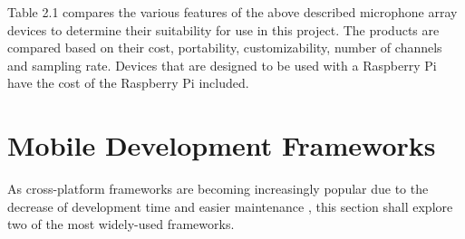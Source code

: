 \documentclass[hidelinks,12pt]{report} %
\begin{document}
\begin{table}[]
\begin{center}
\label{tab:tablelabel}
\caption{Comparison of various Microphone Array Devices}
\end{center}
\end{table}

Table 2.1 compares the various features of the above described microphone array devices to determine their suitability for use in this project. The products are compared based on their cost, portability, customizability, number of channels and sampling rate. Devices that are designed to be used with a Raspberry Pi have the cost of the Raspberry Pi included. 

\section{Mobile Development Frameworks}

As cross-platform frameworks are becoming increasingly popular due to the decrease of development time and easier maintenance \cite{25}, this section shall explore two of the most widely-used frameworks.
\end{document}
